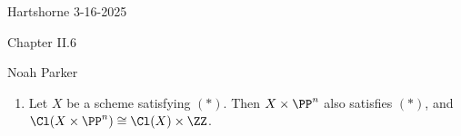 \documentclass[12pt]{amsart}
\begin{document}
{Hartshorne} \hfill {3-16-2025}

\bigskip\bigskip

\begin{center}

{\sc Chapter II.6}

\end{center}

\begin{center}

  {Noah Parker} 
    
\end{center}

\bigskip\bigskip

\begin{enumerate}
  \item[6.1.] {
      Let $X$ be a scheme satisfying $(*)$.
      Then $X\times \PP^n$ also satisfies $(*)$, and $\Cl(X\times \PP^n)\cong \Cl(X)\times \ZZ$.
    }
\end{enumerate}
\end{document}
